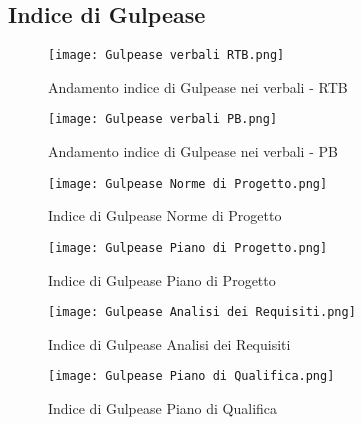 \newpage

\subsection{Indice di Gulpease}
\label{subsec:Indice di Gulpease}


\begin{figure}[h!] 
    \centering
    \texttt{[image: Gulpease verbali RTB.png]}
    \caption{Andamento indice di Gulpease nei verbali - RTB} 
    \label{fig: Andamento Gulpease verbali RTB}
\end{figure}

\begin{figure}[h!] 
    \centering
    \texttt{[image: Gulpease verbali PB.png]}
    \caption{Andamento indice di Gulpease nei verbali - PB} 
    \label{fig: Andamento Gulpease verbali PB}
\end{figure}

\begin{figure}[h!]
    \centering

    \begin{minipage}{.4\textwidth}
        \centering
        \texttt{[image: Gulpease Norme di Progetto.png]}
        \caption{Indice di Gulpease Norme di Progetto}
        \label{fig:Gulpease Norme Progetto}
    \end{minipage}
    \hfill
    \begin{minipage}{.4\textwidth}
        \centering
        \texttt{[image: Gulpease Piano di Progetto.png]}
        \caption{Indice di Gulpease Piano di Progetto}
        \label{fig:Gulpease Piano Progetto}
    \end{minipage}

\end{figure}

\begin{figure}[H]
    \centering

    \begin{minipage}{.4\textwidth}
        \centering
        \texttt{[image: Gulpease Analisi dei Requisiti.png]}
        \caption{Indice di Gulpease Analisi dei Requisiti}
        \label{fig:Gulpease Analisi Requisiti}
    \end{minipage}%
    \hfill
    \begin{minipage}{.4\textwidth}
        \centering
        \texttt{[image: Gulpease Piano di Qualifica.png]}
        \caption{Indice di Gulpease Piano di Qualifica}
        \label{fig:Gulpease Piano Qualifica}
    \end{minipage}

\end{figure}

